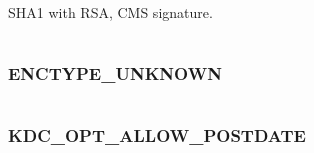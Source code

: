 \documentclass[letterpaper,10pt,english]{sphinxmanual}
\begin{document}
SHA1 with RSA, CMS signature.

\begin{tabulary}{\linewidth}{|L|L|}
\hline

 & 
\\\hline
\end{tabulary}



\subsubsection{ENCTYPE\_UNKNOWN}
\label{appdev/refs/macros/ENCTYPE_UNKNOWN:enctype-unknown}\label{appdev/refs/macros/ENCTYPE_UNKNOWN::doc}\label{appdev/refs/macros/ENCTYPE_UNKNOWN:enctype-unknown-data}

\begin{fulllineitems}
\label{appdev/refs/macros/ENCTYPE_UNKNOWN:ENCTYPE_UNKNOWN}
\end{fulllineitems}


\begin{tabulary}{\linewidth}{|L|L|}
\hline

 & 
\\\hline
\end{tabulary}



\subsubsection{KDC\_OPT\_ALLOW\_POSTDATE}
\label{appdev/refs/macros/KDC_OPT_ALLOW_POSTDATE:kdc-opt-allow-postdate}\label{appdev/refs/macros/KDC_OPT_ALLOW_POSTDATE:kdc-opt-allow-postdate-data}\label{appdev/refs/macros/KDC_OPT_ALLOW_POSTDATE::doc}

\begin{fulllineitems}
\label{appdev/refs/macros/KDC_OPT_ALLOW_POSTDATE:KDC_OPT_ALLOW_POSTDATE}
\end{fulllineitems}


\begin{tabulary}{\linewidth}{|L|L|}
\hline

 & 
\\\hline
\end{tabulary}
\end{document}
